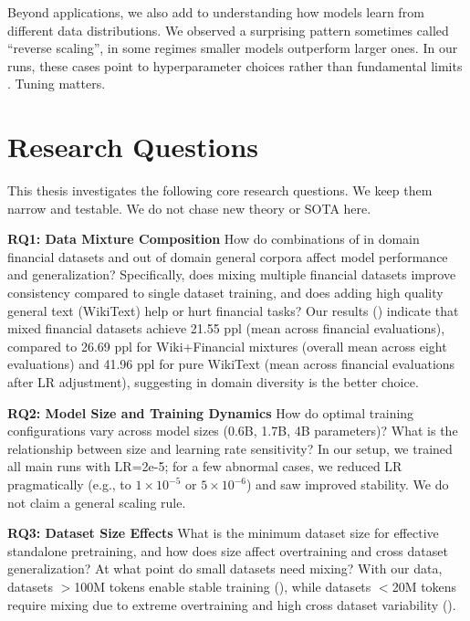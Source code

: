 Beyond applications, we also add to understanding how models learn from different data distributions. We observed a surprising pattern sometimes called ``reverse scaling'', in some regimes smaller models outperform larger ones. In our runs, these cases point to hyperparameter choices rather than fundamental limits \parencite{kaplan2020scaling,hoffmann2022training,mccandlish2018empirical}. Tuning matters.

\section{Research Questions}

This thesis investigates the following core research questions. We keep them narrow and testable. We do not chase new theory or SOTA here.

\textbf{RQ1: Data Mixture Composition}
How do combinations of in domain financial datasets and out of domain general corpora affect model performance and generalization? Specifically, does mixing multiple financial datasets improve consistency compared to single dataset training, and does adding high quality general text (WikiText) help or hurt financial tasks? Our results () indicate that mixed financial datasets achieve 21.55 ppl (mean across financial evaluations), compared to 26.69 ppl for Wiki+Financial mixtures (overall mean across eight evaluations) and 41.96 ppl for pure WikiText (mean across financial evaluations after LR adjustment), suggesting in domain diversity is the better choice.

\textbf{RQ2: Model Size and Training Dynamics}
How do optimal training configurations vary across model sizes (0.6B, 1.7B, 4B parameters)? What is the relationship between size and learning rate sensitivity? In our setup, we trained all main runs with LR=2e-5; for a few abnormal cases, we reduced LR pragmatically (e.g., to $1\times10^{-5}$ or $5\times10^{-6}$) and saw improved stability. We do not claim a general scaling rule.

\textbf{RQ3: Dataset Size Effects}
What is the minimum dataset size for effective standalone pretraining, and how does size affect overtraining and cross dataset generalization? At what point do small datasets need mixing? With our data, datasets $>$100M tokens enable stable training (), while datasets $<$20M tokens require mixing due to extreme overtraining and high cross dataset variability ().

